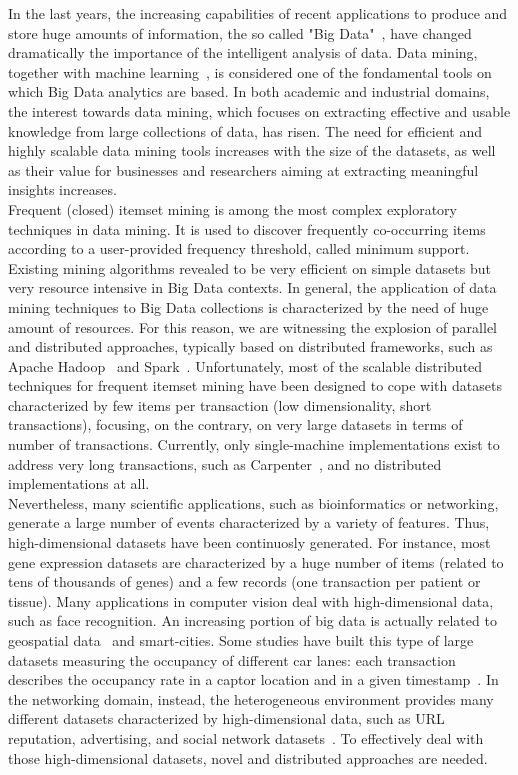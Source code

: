 In the last years, the increasing capabilities of recent applications
to produce and store huge amounts of information,
the so called "Big Data"~\cite{Jin201559}, have changed dramatically
the importance of the intelligent analysis of data.
Data mining, together with machine learning~\cite{DBLP:journals/bdr/Al-JarrahYMKT15}, 
is considered
one of the fondamental tools on which Big Data analytics
are based.
In both academic and industrial domains, the interest towards data mining,
which focuses on extracting effective and usable knowledge from large
collections of data, has risen.
The need for efficient and highly scalable data mining tools increases with the
size of the datasets,
as well as their value for businesses and researchers aiming at extracting
meaningful insights increases.\\
Frequent (closed) itemset mining is among the most complex exploratory
techniques in data mining.
It is used to discover frequently co-occurring items
according to a user-provided frequency threshold, called minimum support.
Existing mining algorithms revealed to be very efficient on simple datasets
but very resource intensive in Big Data contexts.
In general, the application of data mining techniques to Big Data collections
is characterized by the need of huge amount of resources.
For this reason, we are witnessing the explosion of parallel and distributed
approaches,
typically based on distributed frameworks, such as Apache Hadoop~\cite{HDFS}
and Spark~\cite{Zaharia_spark}.
Unfortunately, most of the scalable distributed techniques
for frequent itemset mining have been designed to cope with datasets
characterized by few items per transaction (low dimensionality, short
transactions),
focusing, on the contrary, on very large datasets in terms of number of
transactions.
Currently, only single-machine implementations exist to address very long
transactions,
such as Carpenter~\cite{Zaki_Carpenter}, and no distributed implementations at
all.\\
Nevertheless, many scientific applications, such as bioinformatics or networking, 
generate a large number of events characterized by a variety of features.
Thus, high-dimensional datasets have been continuosly generated.
For instance, most gene expression datasets are characterized by
a huge number of items (related to tens of thousands of genes)
and a few records (one transaction per patient or tissue).
Many applications in computer vision deal with high-dimensional data, such as
face recognition.
An increasing portion of big data is actually related to geospatial data~\cite{Lee201574} and
smart-cities. Some studies have built this type of large datasets
measuring the occupancy of different car lanes:
each transaction describes the occupancy rate in a captor location and in a
given timestamp~\cite{PEMSDataset}.
In the networking domain, instead,
the heterogeneous environment provides many different datasets
characterized by high-dimensional data,
such as URL reputation, advertising, and social network
datasets~\cite{snapnets}.
To effectively deal with those high-dimensional datasets,
novel and distributed approaches are needed.

